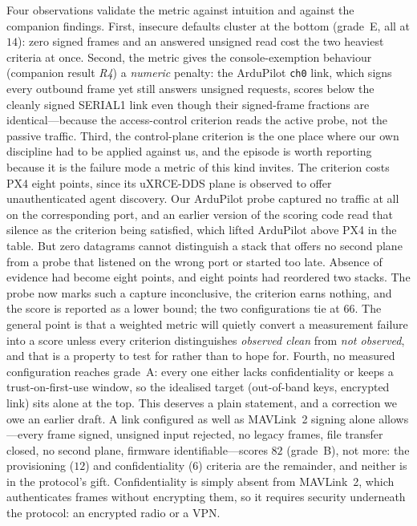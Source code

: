 \documentclass[conference]{IEEEtran}
\newcommand{\code}[1]{\texttt{#1}}
\begin{document}
Four observations validate the metric against intuition and against the companion
findings. First, insecure defaults cluster at the bottom (grade~E, all at
$14$): zero signed frames and an answered unsigned read cost the two
heaviest criteria at once. Second, the metric gives the console-exemption
behaviour (companion result \emph{R4}) a \emph{numeric} penalty: the ArduPilot
\code{ch0} link, which signs every outbound frame yet still answers unsigned
requests, scores below the cleanly signed SERIAL1 link even though their
signed-frame fractions are identical---because the access-control criterion reads
the active probe, not the passive traffic. Third, the control-plane criterion is the one place where our own
discipline had to be applied against us, and the episode is worth reporting
because it is the failure mode a metric of this kind invites. The criterion
costs PX4 eight points, since its uXRCE-DDS plane is observed to offer
unauthenticated agent discovery. Our ArduPilot probe captured no traffic at all
on the corresponding port, and an earlier version of the scoring code read that
silence as the criterion being satisfied, which lifted ArduPilot above PX4 in
the table. But zero datagrams cannot distinguish a stack that offers no second
plane from a probe that listened on the wrong port or started too late. Absence
of evidence had become eight points, and eight points had reordered two stacks.
The probe now marks such a capture inconclusive, the criterion earns nothing,
and the score is reported as a lower bound; the two configurations tie at $66$.
The general point is that a weighted metric will quietly convert a measurement
failure into a score unless every criterion distinguishes \emph{observed clean}
from \emph{not observed}, and that is a property to test for rather than to
hope for. Fourth, no measured configuration
reaches grade~A: every one either lacks confidentiality or keeps a
trust-on-first-use window, so the idealised target (out-of-band keys, encrypted
link) sits alone at the top. This deserves a plain statement, and a correction we
owe an earlier draft. A link configured as well as MAVLink~2 signing alone
allows---every frame signed, unsigned input rejected, no legacy frames, file
transfer closed, no second plane, firmware identifiable---scores $82$ (grade~B),
not more: the provisioning ($12$) and confidentiality ($6$) criteria are the
remainder, and neither is in the protocol's gift. Confidentiality is simply
absent from MAVLink~2, which authenticates frames without encrypting them, so it
requires security underneath the protocol: an encrypted radio or a VPN.
\end{document}
